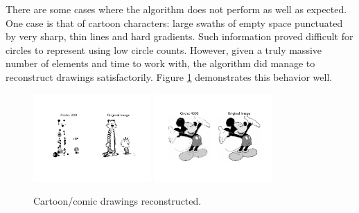 \documentclass[12pt]{article}
\begin{document}
There are some cases where the algorithm does not perform as well as expected. One case is that of cartoon characters: large swaths of empty space punctuated by very sharp, thin lines and hard gradients. Such information proved difficult for circles to represent using low circle counts. However, given a truly massive number of elements and time to work with, the algorithm did manage to reconstruct drawings satisfactorily. Figure \ref{fig:hobbes_0200} demonstrates this behavior well. 
\begin{figure}[H]
\centering
\noindent\includegraphics[width=0.4\textwidth]{../results/cartoons/hobbes_0200}
\noindent\includegraphics[width=0.4\textwidth]{../results/mickey/mickey_4000}
\caption{Cartoon/comic drawings reconstructed. }
\label{fig:hobbes_0200}
\end{figure}
\end{document}
